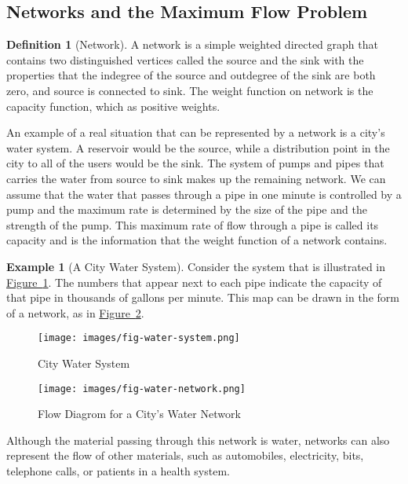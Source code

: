 \documentclass[10pt,]{book}
\theoremstyle{plain}
\theoremstyle{definition}
\newtheorem{definition}[theorem]{Definition}
\theoremstyle{definition}
\theoremstyle{definition}
\newtheorem{example}[theorem]{Example}
\theoremstyle{definition}
\theoremstyle{definition}
\numberwithin{equation}{section}
\begin{document}
\subsection[Networks and the Maximum Flow Problem]{Networks and the Maximum Flow Problem}\label{ss-networks-and-flows}
\begin{definition}[Network]\label{def-network}
 A network is a simple weighted directed graph that contains two distinguished vertices called the  source and the  sink with the properties that the indegree of the source and outdegree of the sink are both zero, and source is connected to sink.  The weight function on network is the capacity function, which as positive weights. %
\end{definition}
An example of a real situation that can be represented by a network is a city's water system. A reservoir would be the source, while a distribution
point in the city to all of the users would be the sink. The system of pumps and pipes that carries the water from source to sink makes up the remaining
network. We can assume that the water that passes through a pipe in one minute is controlled by a pump and the maximum rate is determined by the
size of the pipe and the strength of the pump. This maximum rate of flow through a pipe is called its capacity and is the information that the weight
function of a network contains.%
\begin{example}[A City Water System]\label{ex-city-water}
 Consider the system that is illustrated in \hyperref[fig-water-system]{Figure~\ref{fig-water-system}}. The numbers that appear next to each pipe indicate the capacity of
that pipe in thousands of gallons per minute. This map can be drawn in the form of a network, as in \hyperref[fig-water-network]{Figure~\ref{fig-water-network}}.
%
\leavevmode%
\begin{figure}
\centering
\texttt{[image: images/fig-water-system.png]}
\caption{City Water System
                \label{fig-water-system}}
\end{figure}
\leavevmode%
\begin{figure}
\centering
\texttt{[image: images/fig-water-network.png]}
\caption{Flow Diagrom for a City's Water Network
                \label{fig-water-network}}
\end{figure}
\par
Although the material passing through this network is water, networks can also represent the flow of other materials, such as automobiles, electricity, bits, telephone calls, or patients in a health system.%
\end{example}
\end{document}
